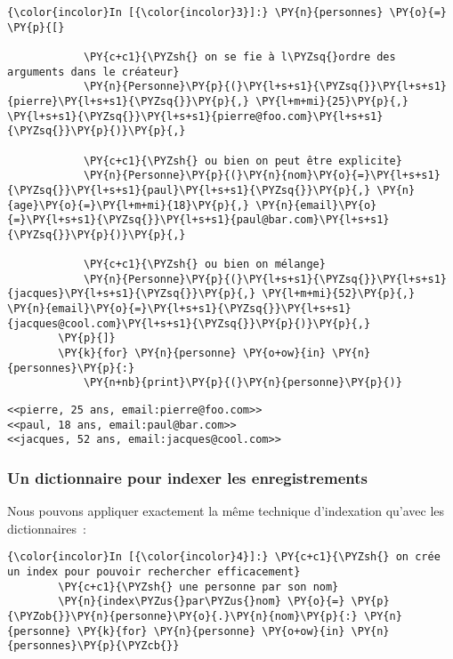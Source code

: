     \begin{Verbatim}[commandchars=\\\{\},frame=single,framerule=0.3mm,rulecolor=\color{cellframecolor}]
{\color{incolor}In [{\color{incolor}3}]:} \PY{n}{personnes} \PY{o}{=} \PY{p}{[}
        
            \PY{c+c1}{\PYZsh{} on se fie à l\PYZsq{}ordre des arguments dans le créateur}
            \PY{n}{Personne}\PY{p}{(}\PY{l+s+s1}{\PYZsq{}}\PY{l+s+s1}{pierre}\PY{l+s+s1}{\PYZsq{}}\PY{p}{,} \PY{l+m+mi}{25}\PY{p}{,} \PY{l+s+s1}{\PYZsq{}}\PY{l+s+s1}{pierre@foo.com}\PY{l+s+s1}{\PYZsq{}}\PY{p}{)}\PY{p}{,}
        
            \PY{c+c1}{\PYZsh{} ou bien on peut être explicite}
            \PY{n}{Personne}\PY{p}{(}\PY{n}{nom}\PY{o}{=}\PY{l+s+s1}{\PYZsq{}}\PY{l+s+s1}{paul}\PY{l+s+s1}{\PYZsq{}}\PY{p}{,} \PY{n}{age}\PY{o}{=}\PY{l+m+mi}{18}\PY{p}{,} \PY{n}{email}\PY{o}{=}\PY{l+s+s1}{\PYZsq{}}\PY{l+s+s1}{paul@bar.com}\PY{l+s+s1}{\PYZsq{}}\PY{p}{)}\PY{p}{,}
        
            \PY{c+c1}{\PYZsh{} ou bien on mélange}
            \PY{n}{Personne}\PY{p}{(}\PY{l+s+s1}{\PYZsq{}}\PY{l+s+s1}{jacques}\PY{l+s+s1}{\PYZsq{}}\PY{p}{,} \PY{l+m+mi}{52}\PY{p}{,} \PY{n}{email}\PY{o}{=}\PY{l+s+s1}{\PYZsq{}}\PY{l+s+s1}{jacques@cool.com}\PY{l+s+s1}{\PYZsq{}}\PY{p}{)}\PY{p}{,}
        \PY{p}{]}
        \PY{k}{for} \PY{n}{personne} \PY{o+ow}{in} \PY{n}{personnes}\PY{p}{:}
            \PY{n+nb}{print}\PY{p}{(}\PY{n}{personne}\PY{p}{)}
\end{Verbatim}


    \begin{Verbatim}[commandchars=\\\{\},frame=single,framerule=0.3mm,rulecolor=\color{cellframecolor}]
<<pierre, 25 ans, email:pierre@foo.com>>
<<paul, 18 ans, email:paul@bar.com>>
<<jacques, 52 ans, email:jacques@cool.com>>
\end{Verbatim}

    \hypertarget{un-dictionnaire-pour-indexer-les-enregistrements}{%
\subsubsection{Un dictionnaire pour indexer les
enregistrements}\label{un-dictionnaire-pour-indexer-les-enregistrements}}

    Nous pouvons appliquer exactement la même technique d'indexation qu'avec
les dictionnaires~:

    \begin{Verbatim}[commandchars=\\\{\},frame=single,framerule=0.3mm,rulecolor=\color{cellframecolor}]
{\color{incolor}In [{\color{incolor}4}]:} \PY{c+c1}{\PYZsh{} on crée un index pour pouvoir rechercher efficacement}
        \PY{c+c1}{\PYZsh{} une personne par son nom}
        \PY{n}{index\PYZus{}par\PYZus{}nom} \PY{o}{=} \PY{p}{\PYZob{}}\PY{n}{personne}\PY{o}{.}\PY{n}{nom}\PY{p}{:} \PY{n}{personne} \PY{k}{for} \PY{n}{personne} \PY{o+ow}{in} \PY{n}{personnes}\PY{p}{\PYZcb{}}
\end{Verbatim}


